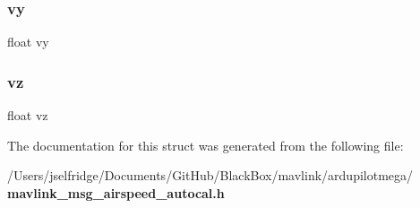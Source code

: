 \mbox{\label{struct____mavlink__airspeed__autocal__t_a56ab444d63dfde57a24271cbe3097fdb}} 
\subsubsection{vy}
{\footnotesize\ttfamily float vy}

\mbox{\label{struct____mavlink__airspeed__autocal__t_a2dc1a0fcac235a430dd8c493502e09e1}} 
\subsubsection{vz}
{\footnotesize\ttfamily float vz}



The documentation for this struct was generated from the following file\+:\begin{DoxyCompactItemize}
\item 
/\+Users/jselfridge/\+Documents/\+Git\+Hub/\+Black\+Box/mavlink/ardupilotmega/\textbf{ mavlink\+\_\+msg\+\_\+airspeed\+\_\+autocal.\+h}\end{DoxyCompactItemize}
